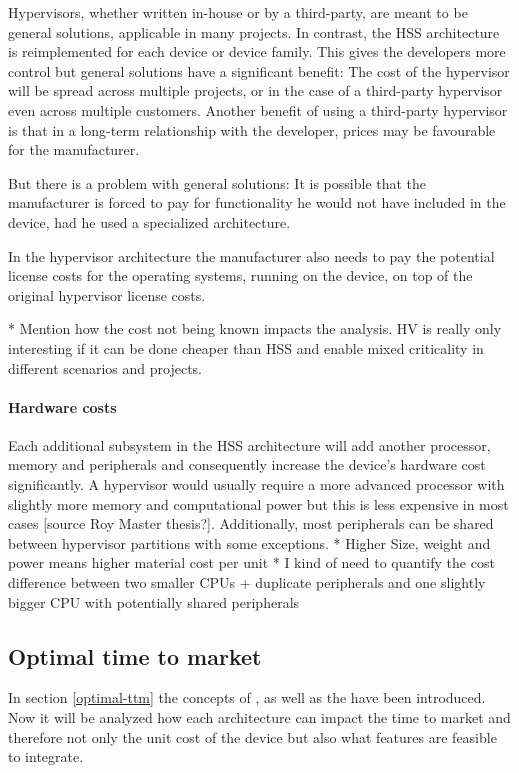 Hypervisors, whether written in-house or by a third-party, are meant to be general solutions, applicable in many projects. In contrast, the \gls{HSS} architecture is reimplemented for each device or device family. This gives the developers more control but general solutions have a significant benefit: The cost of the hypervisor will be spread across multiple projects, or in the case of a third-party hypervisor even across multiple customers. Another benefit of using a third-party hypervisor is that in a long-term relationship with the developer, prices may be favourable for the manufacturer.

But there is a problem with general solutions: It is possible that the manufacturer is forced to pay for functionality he would not have included in the device, had he used a specialized architecture. 

In the hypervisor architecture the manufacturer also needs to pay the potential license costs for the operating systems, running on the device, on top of the original hypervisor license costs.

* Mention how the cost not being known impacts the analysis. HV is really only interesting if it can be done cheaper than HSS and enable mixed criticality in different scenarios and projects. 

\paragraph{Hardware costs}
Each additional subsystem in the \gls{HSS} architecture will add another processor, memory and peripherals and consequently increase the device's hardware cost significantly. A hypervisor would usually require a more advanced processor with slightly more memory and computational power but this is less expensive in most cases [source Roy Master thesis?]. Additionally, most peripherals can be shared between hypervisor partitions with some exceptions.
* Higher Size, weight and power means higher material cost per unit
	* I kind of need to quantify the cost difference between two smaller CPUs 		+ duplicate peripherals and one slightly bigger CPU with potentially 		shared peripherals

\subsection{Optimal time to market}
In section \ref{optimal-ttm} the concepts of , as well as the have been introduced. Now it will be analyzed how each architecture can impact the time to market and therefore not only the unit cost of the device but also what features are feasible to integrate.


